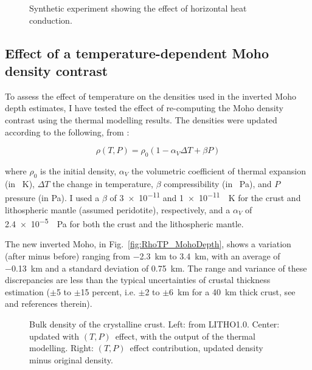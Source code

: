 \begin{subappendices}
\begin{figure}
	\begin{adjustbox}{center}
	\end{adjustbox}
	\caption[Synthetic experiment showing the effect of horizontal heat conduction.]{Synthetic experiment showing the effect of horizontal heat conduction.}
	\label{fig:2Deff}
\end{figure}

\FloatBarrier

\subsection{Effect of a temperature-dependent Moho density contrast}
\label{ss:ApplSup:MethodTests:MohoDeltaRho}

To assess the effect of temperature on the densities used in the inverted Moho depth estimates, I have tested the effect of re-computing the Moho density contrast using the thermal modelling results.
The densities were updated according to the following, from \textcite{allen2013basin}:

\begin{equation*}
    \rho(T,P) = \rho_0 (1 - \alpha_V \Delta T + \beta P) 
\end{equation*}

where $\rho_0$ is the initial density, $\alpha_V$ the volumetric coefficient of thermal expansion (in \si{\per \kelvin}), $\Delta T$ the change in temperature, $\beta$ compressibility (in \si{\per \pascal}), and $P$ pressure (in \si{\pascal}). I used a $\beta$ of \num{3e-11} and \SI{1e-11}{\per \kelvin} for the crust and lithospheric mantle (assumed peridotite), respectively, and a $\alpha_V$ of \SI{2.4e-5}{\per \pascal} for both the crust and the lithospheric mantle.

The new inverted Moho, in Fig.~\ref{fig:RhoTP_MohoDepth}, shows a variation (after minus before) ranging from \SI{-2.3}{\kilo \metre} to \SI[retain-explicit-plus]{+3.4}{\kilo \metre}, with an average of \SI{-0.13}{\kilo \metre} and a standard deviation of \SI{0.75}{\kilo \metre}.
The range and variance of these discrepancies are less than the typical uncertainties of crustal thickness estimation ($\pm$\num{5} to $\pm$\num{15} percent, i.e. $\pm$\num{2} to $\pm$\SI{6}{\kilo \metre} for a \SI{40}{\kilo \metre} thick crust, see \cite{Grad2009} and references therein).

\begin{figure}
	\begin{adjustbox}{center}
	\end{adjustbox}
	\caption[Bulk density of the crystalline crust, effect of temperature dependence.]{Bulk density of the crystalline crust.
	Left: from LITHO1.0.
	Center: updated with $(T,P)$~effect, with the output of the thermal modelling. 
	Right: $(T,P)$~effect contribution, updated density minus original density.}
	\label{fig:RhoTP_RhoC}
\end{figure}


\end{subappendices}
